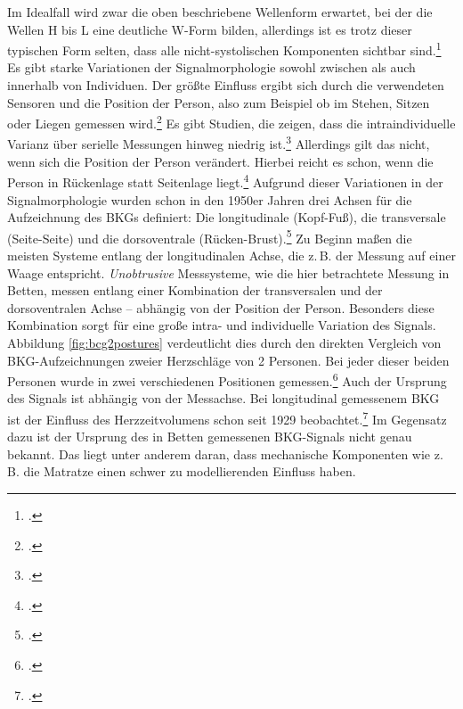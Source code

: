 	Im Idealfall wird zwar die oben beschriebene Wellenform erwartet, bei der die Wellen H bis L eine deutliche W-Form bilden, allerdings ist es trotz dieser typischen Form selten, dass alle nicht-systolischen Komponenten sichtbar sind.\footcite{Pinheiro2010} Es gibt starke Variationen der Signalmorphologie sowohl zwischen als auch innerhalb von Individuen. Der größte Einfluss ergibt sich durch die verwendeten Sensoren und die Position der Person, also zum Beispiel ob im Stehen, Sitzen oder Liegen gemessen wird.\footcite{Sadek2019} Es gibt Studien, die zeigen, dass die intraindividuelle Varianz über serielle Messungen hinweg niedrig ist.\footcite{Inan2015} Allerdings gilt das nicht, wenn sich die Position der Person verändert. Hierbei reicht es schon, wenn die Person in Rückenlage statt Seitenlage liegt.\footcite{Bruser2011} Aufgrund dieser Variationen in der Signalmorphologie wurden schon in den 1950er Jahren drei Achsen für die Aufzeichnung des \ac{BKG}s definiert: Die longitudinale (Kopf-Fuß), die transversale (Seite-Seite) und die dorsoventrale (Rücken-Brust).\footcite{Bruser2011, Inan2015} Zu Beginn maßen die meisten Systeme entlang der longitudinalen Achse, die z.\,B. der Messung auf einer Waage entspricht. \textit{Unobtrusive} Messsysteme, wie die hier betrachtete Messung in Betten, messen entlang einer Kombination der transversalen und der dorsoventralen Achse -- abhängig von der Position der Person. Besonders diese Kombination sorgt für eine große intra- und individuelle Variation des Signals. Abbildung \ref{fig:bcg2postures} verdeutlicht dies durch den direkten Vergleich von \ac{BKG}-Aufzeichnungen zweier Herzschläge von 2 Personen. Bei jeder dieser beiden Personen wurde in zwei verschiedenen Positionen gemessen.\footcite{Bruser2011} Auch der Ursprung des Signals ist abhängig von der Messachse. Bei longitudinal gemessenem \ac{BKG} ist der Einfluss des Herzzeitvolumens schon seit 1929 beobachtet.\footcite{Starr1939} Im Gegensatz dazu ist der Ursprung des in Betten gemessenen \ac{BKG}-Signals nicht genau bekannt. Das liegt unter anderem daran, dass mechanische Komponenten wie z.\,B. die Matratze einen schwer zu modellierenden Einfluss haben.
	
